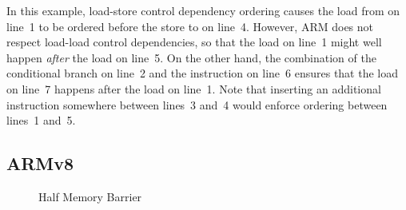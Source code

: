 In this example, load-store control dependency ordering causes
the load from  on line~1 to be ordered before the store to
 on line~4.
However, ARM does not respect load-load control dependencies, so that
the load on line~1 might well happen \emph{after} the
load on line~5.
On the other hand, the combination of the conditional branch on line~2
and the  instruction on line~6 ensures that
the load on line~7 happens after the load on line~1.
Note that inserting an additional  instruction somewhere between
lines~3 and~4 would enforce ordering between lines~1 and~5.
\fi

\subsection{ARMv8}

\begin{figure}[tb]
\centering
{}
\caption{Half Memory Barrier}
\end{figure}

